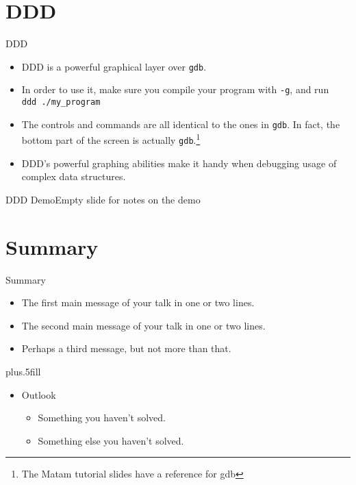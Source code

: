 \documentclass[handout]{beamer}
\begin{document}
\section{DDD}

\begin{frame}{DDD}
  \begin{itemize}
    \item DDD is a powerful graphical layer over \texttt{gdb}.
    \item In order to use it, make sure you compile your program with
      \texttt{-g}, and run \\
      \texttt{ddd ./my\_program}
    \item The controls and commands are all identical to the ones in
      \texttt{gdb}. In fact, the bottom part of the screen is actually
      \texttt{gdb}.\footnote{The Matam tutorial slides have a reference
      for gdb}
    \item DDD's powerful graphing abilities make it handy when debugging
      usage of complex data structures.
  \end{itemize}
\end{frame}

 {
\begin{frame}{DDD Demo}{Empty slide for notes on the demo}
\end{frame}
}

\section*{Summary}

\begin{frame}{Summary}

  \begin{itemize}
  \item
    The \alert{first main message} of your talk in one or two lines.
  \item
    The \alert{second main message} of your talk in one or two lines.
  \item
    Perhaps a \alert{third message}, but not more than that.
  \end{itemize}
  
  \vskip0pt plus.5fill
  \begin{itemize}
  \item
    Outlook
    \begin{itemize}
    \item
      Something you haven't solved.
    \item
      Something else you haven't solved.
    \end{itemize}
  \end{itemize}
\end{frame}
\end{document}
